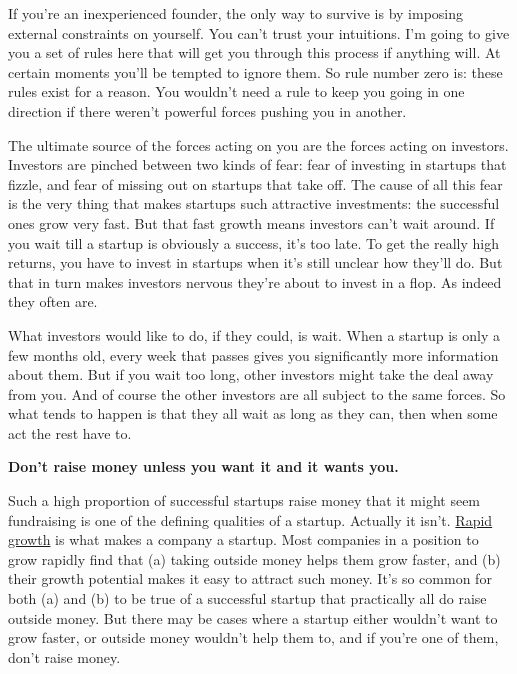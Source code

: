 If you're an inexperienced founder, the only
                    way to survive is by imposing external constraints on
                    yourself. You can't trust your intuitions. I'm going to give
                    you a set of rules here that will get you through this
                    process if anything will. At certain moments you'll be
                    tempted to ignore them. So rule number zero is: these rules
                    exist for a reason. You wouldn't need a rule to keep you
                    going in one direction if there weren't powerful forces
                    pushing you in another.

The ultimate source of
                    the forces acting on you are the forces acting on investors.
                    Investors are pinched between two kinds of fear: fear of
                    investing in startups that fizzle, and fear of missing out
                    on startups that take off. The cause of all this fear is the
                    very thing that makes startups such attractive investments:
                    the successful ones grow very fast. But that fast growth
                    means investors can't wait around. If you wait till a
                    startup is obviously a success, it's too late. To get the
                    really high returns, you have to invest in startups when
                    it's still unclear how they'll do. But that in turn makes
                    investors nervous they're about to invest in a flop. As
                    indeed they often are.

What investors would like
                    to do, if they could, is wait. When a startup is only a few
                    months old, every week that passes gives you significantly
                    more information about them. But if you wait too long, other
                    investors might take the deal away from you. And of course
                    the other investors are all subject to the same forces. So
                    what tends to happen is that they all wait as long as they
                    can, then when some act the rest have to.


                    \textbf{Don't raise money unless you want it and it wants you.}

Such a high proportion of successful startups
                    raise money that it might seem fundraising is one of the
                    defining qualities of a startup. Actually it isn't.
                    \href{http://www.paulgraham.com/growth.html}{Rapid growth} is what makes a
                    company a startup. Most companies in a position to grow
                    rapidly find that (a) taking outside money helps them grow
                    faster, and (b) their growth potential makes it easy to
                    attract such money. It's so common for both (a) and (b) to
                    be true of a successful startup that practically all do
                    raise outside money. But there may be cases where a startup
                    either wouldn't want to grow faster, or outside money
                    wouldn't help them to, and if you're one of them, don't
                    raise money.

